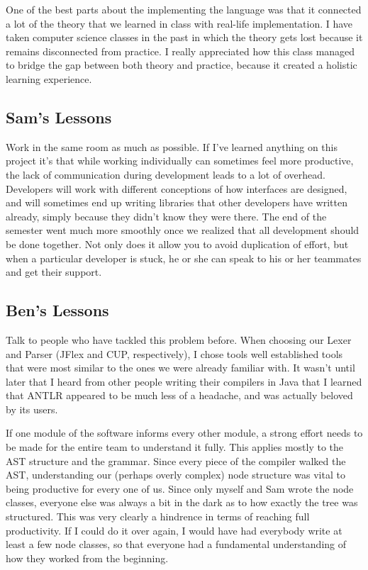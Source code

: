 \documentclass{report}
\begin{document}
One of the best parts about the implementing the language was that it connected a lot of the theory that we learned in class with real-life implementation.  I have taken computer science classes in the past in which the theory gets lost because it remains disconnected from practice. I really appreciated how this class managed to bridge the gap between both theory and practice, because it created a holistic learning experience.



\subsection{Sam's Lessons}
\label{sub:sams-lessons}

Work in the same room as much as possible. If I've learned anything on this
project it's that while working individually can sometimes feel more
productive, the lack of communication during development leads to a lot of
overhead. Developers will work with different conceptions of how interfaces are
designed, and will sometimes end up writing libraries that other developers
have written already, simply because they didn't know they were there. The end
of the semester went much more smoothly once we realized that all development
should be done together. Not only does it allow you to avoid duplication of effort, but
when a particular developer is stuck, he or she can speak to his or her teammates and
get their support.

\subsection{Ben's Lessons}
\label{sub:bens-lessons}

Talk to people who have tackled this problem before. When choosing our Lexer and Parser (JFlex and CUP, respectively), I chose tools well established tools that were most similar to the ones we were already familiar with. It wasn't until later that I heard from other people writing their compilers in Java that I learned that ANTLR appeared to be much less of a headache, and was actually beloved by its users.

If one module of the software informs every other module, a strong effort needs to be made for the entire team to understand it fully. This applies mostly to the AST structure and the grammar. Since every piece of the compiler walked the AST, understanding our (perhaps overly complex) node structure was vital to being productive for every one of us. Since only myself and Sam wrote the node classes, everyone else was always a bit in the dark as to how exactly the tree was structured. This was very clearly a hindrence in terms of reaching full productivity. If I could do it over again, I would have had everybody write at least a few node classes, so that everyone had a fundamental understanding of how they worked from the beginning.
\end{document}
